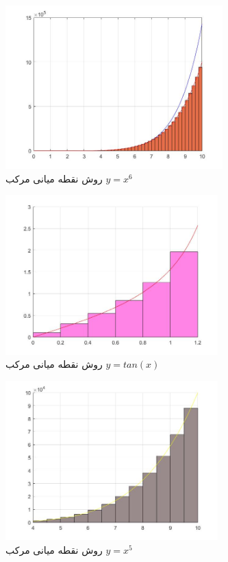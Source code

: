 \documentclass{article}
\begin{document}
\begin{figure}[!h]
    \centering
\includegraphics[width=8.4cm]{pic40codeintegral.jpg}
    \caption{ روش نقطه میانی مرکب $y=x^6$ }
    \label{fig:انتگرال خط}
\end{figure}

\begin{figure}[!h]
    \centering
\includegraphics[width=8.2cm]{pic41codeIntegral.jpg}
    \caption{ روش نقطه میانی مرکب $y=tan(x)$ }
    \label{fig:انتگرال خط}
\end{figure}


\begin{figure}[!h]
    \centering
\includegraphics[width=8.2cm]{pic43IntegralCode.jpg}
    \caption{ روش نقطه میانی مرکب $y=x^5$ }
    \label{fig:انتگرال خط}
\end{figure}
\end{document}
